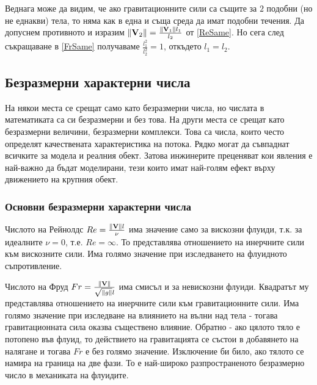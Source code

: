 \documentclass[bulgarian, 12pt]{article}
\begin{document}
Веднага може да видим, че ако гравитационните сили са същите за $2$ подобни (но не еднакви) тела, то няма как в една и съща среда да имат подобни течения.
Да допуснем противното и изразим $\norm{\mathbf{V}_2} = \frac{\norm{\mathbf{V}_1} l_1}{l_2}$ от \eqref{ReSame}.
Но сега след съкращаване в \eqref{FrSame} получаваме $\frac{l_1^2}{l_2^2} = 1$, откъдето $l_1 = l_2$.

\subsection{Безразмерни характерни числа}
На някои места се срещат само като безразмерни числа, но числата в математиката са си безразмерни и без това.
На други места се срещат като безразмерни величини, безразмерни комплекси. 
Това са числа, които често определят качествената характеристика на потока.
Рядко могат да съвпаднат всичките за модела и реалния обект.
Затова инжинерите преценяват кои явления е най-важно да бъдат моделирани, тези които имат най-голям ефект върху движението на крупния обект.
\subsubsection{Основни безразмерни характерни числа}
Числото на Рейнолдс $Re = \frac{\norm{\mathbf{V}} l}{\nu}$ има значение само за вискозни флуиди, т.к. за идеалните $\nu = 0$, т.е. $Re = \infty$.
То представлява отношението на инерчните сили към вискозните сили.
Има голямо значение при изследването на флуидното съпротивление.

Числото на Фруд $Fr = \frac{\norm{\mathbf{V}}}{\sqrt{\norm{g}} l}$ има смисъл и за невискозни флуиди.
Квадратът му представлява отношението на инерчните сили към гравитационните сили. 
Има голямо значение при изследване на влиянието на вълни над тела - тогава гравитационната сила оказва съществено влияние.
Обратно - ако цялото тяло е потопено във флуид, то действието на гравитацията се състои в добавянето на налягане и тогава $Fr$ е без голямо значение.
Изключение би било, ако тялото се намира на граница на две фази.
То е най-широко разпространеното безразмерно число в механиката на флуидите.
\end{document}
